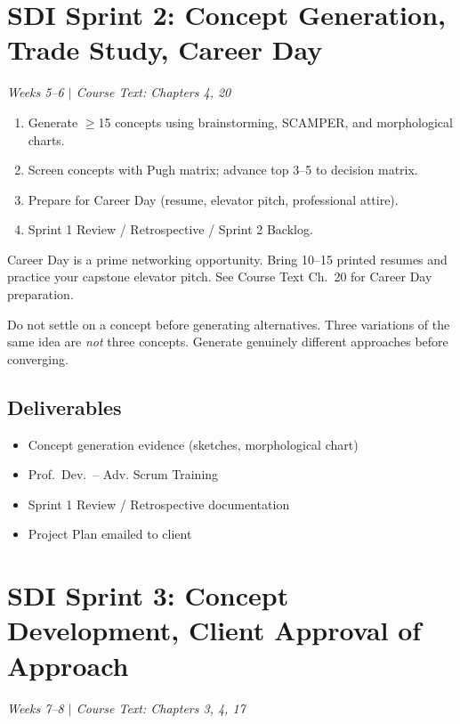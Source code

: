 \documentclass[11pt,letterpaper]{article}
\begin{document}
\section{SDI Sprint 2: Concept Generation, Trade Study, Career Day}
\textit{Weeks 5--6 $|$ Course Text: Chapters 4, 20}

\begin{priorities}
\begin{enumerate}[nosep]
\item Generate $\geq$15 concepts using brainstorming, SCAMPER, and morphological charts.
\item Screen concepts with Pugh matrix; advance top 3--5 to decision matrix.
\item Prepare for Career Day (resume, elevator pitch, professional attire).
\item Sprint 1 Review / Retrospective / Sprint 2 Backlog.
\end{enumerate}
\end{priorities}

\begin{protip}
Career Day is a prime networking opportunity. Bring 10--15 printed resumes and practice your capstone elevator pitch. See Course Text Ch.~20 for Career Day preparation.
\end{protip}

\begin{warnbox}
Do not settle on a concept before generating alternatives. Three variations of the same idea are \emph{not} three concepts. Generate genuinely different approaches before converging.
\end{warnbox}

\subsection{Deliverables}
\begin{itemize}[nosep,leftmargin=1.5em]
\item Concept generation evidence (sketches, morphological chart)
\item Prof.~Dev.~-- Adv. Scrum Training
\item Sprint 1 Review / Retrospective documentation
\item Project Plan emailed to client
\end{itemize}


\section{SDI Sprint 3: Concept Development, Client Approval of Approach}
\textit{Weeks 7--8 $|$ Course Text: Chapters 3, 4, 17}
\end{document}
